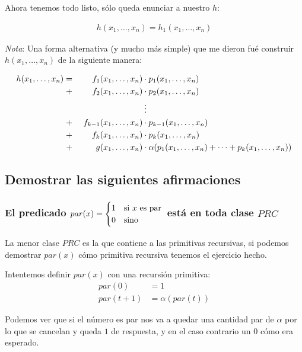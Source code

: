 \documentclass[fleqn, 11pt]{article}
\begin{document}
Ahora tenemos todo listo, sólo queda enunciar a nuestro $h$:

\begin{align*}
	h(x_1, \dots, x_n) = h_1(x_1, \dots, x_n)
\end{align*}

\emph{Nota}: Una forma alternativa (y mucho más simple) que me dieron fué
construir \\ $h(x_1, \dots, x_n)$ de la siguiente manera:

\begin{alignat*}{3}
	h(x_1, \dots, x_n)
	=&& f_1(x_1, \dots, x_n) &\cdot p_1(x_1, \dots, x_n) \\
	+&& f_2(x_1, \dots, x_n) &\cdot p_2(x_1, \dots, x_n) \\
	&&&\vdotswithin{\cdot} \\
	+&& \ f_{k-1}(x_1, \dots, x_n) &\cdot p_{k-1}(x_1, \dots, x_n) \\
	+&& f_k(x_1, \dots, x_n) &\cdot p_k(x_1, \dots, x_n) \\
	+&& g(x_1, \dots, x_n)
	&\cdot \alpha(p_1(x_1, \dots, x_n) + \cdots + p_k(x_1, \dots, x_n))
\end{alignat*}

\subsection{Demostrar las siguientes afirmaciones}

\subsubsection{El predicado $par (x) =
\protect\begin{cases}
	1 & \text{si $x$ es par} \\
	0 & \text{sino}
\protect\end{cases}$ está en toda clase $PRC$}

La menor clase $PRC$ es la que contiene a las primitivas recursivas, si podemos
demostrar $par(x)$ cómo primitiva recursiva tenemos el ejercicio hecho.

Intentemos definir $par(x)$ con una recursión primitiva:
\begin{align*}
	par(0)     &= 1 \\
	par(t + 1) &= \alpha(par(t))
\end{align*}

Podemos ver que si el número es par nos va a quedar una cantidad par de
$\alpha$ por lo que se cancelan y queda $1$ de respuesta, y en el caso
contrario un $0$ cómo era esperado.
\end{document}
